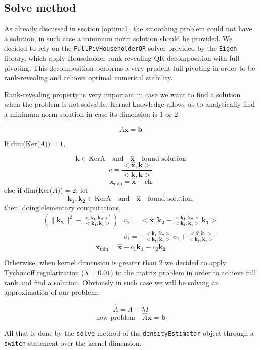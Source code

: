 \subsection{Solve method} \label{solvemethod}
As already discussed in section \ref{optimal}, the smoothing problem could not have a solution, in such case a minimum norm solution should be provided.
We decided to rely on the \verb|FullPivHouseholderQR| solver provided by the \verb|Eigen| library, which apply Householder rank-revealing QR decomposition with full pivoting. This decomposition performs a very prudent full pivoting in order to be rank-revealing and achieve optimal numerical stability. 

Rank-revealing property is very important in case we want to find a solution when the problem is not solvable. Kernel knowledge allows us to analytically find a minimum norm solution in case its dimension is 1 or 2:

\[ A\bm{x}=\bm{b} \]

If dim(Ker($A$))$=1$,
	
\[ \bm{k}\in\text{Ker{A}} \quad \text{and} \quad \bm{\hat{x}} \quad \text{found solution} \]
\[ c=\frac{<\bm{\hat{x}},\bm{k}>}{<\bm{k},\bm{k}>} \]
\[ \bm{x}_{\text{min}} = \bm{\hat{x}} - c\bm{k} \]
else if dim(Ker($A$))$=2$, let
\[ \bm{k_1}, \bm{k_2} \in\text{Ker{A}} \quad \text{and} \quad \bm{\hat{x}} \quad \text{found solution,} \]
then, doing elementary computations,
\begin{align*}
\left( \| \bm{k_2} \|^2 - \frac{<\bm{k_1},\bm{k_2}>^2}{<\bm{k_1},\bm{k_1}>} \right) &c_2 = \, <\bm{\hat{x}},\bm{k_2} - \frac{<\bm{k_1},\bm{k_2}>}{<\bm{k_1},\bm{k_1}>} \, \bm{k_1}> \\
&c_1 = - \frac{<\bm{k_1},\bm{k_2}>}{<\bm{k_1},\bm{k_1}>} \, c_2 +  \frac{<\bm{\hat{x}},\bm{k_1}>}{<\bm{k_1},\bm{k_1}>}
\end{align*}  
\[ \bm{x}_{\text{min}} = \bm{\hat{x}} - c_1\bm{k_1} - c_2\bm{k_2} \]


Otherwise, when kernel dimension is greater than 2 we decided to apply Tychonoff regularization ($\lambda=0.01$) to the matrix problem in order to achieve full rank and find a solution. Obviously in such case we will be solving an approximation of our problem:

\[  \hat{A}=A + \lambda I \]
\[  \text{new problem} \quad \hat{A}\bm{x}=\bm{b} \]

All that is done by the \verb|solve| method of the \verb|densityEstimator| object through a \verb|switch| statement over the kernel dimension.

